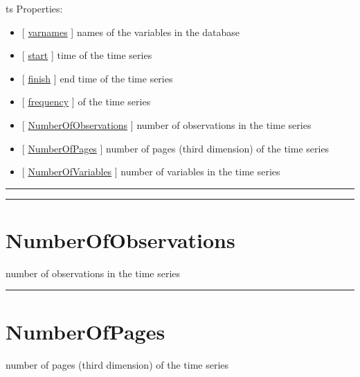 \documentclass[letterpaper,10pt,english]{sphinxmanual}
\begin{document}
ts  Properties:
\begin{itemize}
\item {} 
{[} {\hyperref[classes/time_series/@ts/ts:varnames]{varnames}} {]}   names of the variables in the database

\item {} 
{[} {\hyperref[classes/time_series/@ts/ts:start]{start}} {]} time of the time series

\item {} 
{[} {\hyperref[classes/time_series/@ts/ts:finish]{finish}} {]}   end time of the time series

\item {} 
{[} {\hyperref[classes/time_series/@ts/ts:frequency]{frequency}} {]} of the time series

\item {} 
{[} {\hyperref[classes/time_series/@ts/ts:numberofobservations]{NumberOfObservations}} {]}   number of observations in the time series

\item {} 
{[} {\hyperref[classes/time_series/@ts/ts:numberofpages]{NumberOfPages}} {]}   number of pages (third dimension) of the time series

\item {} 
{[} {\hyperref[classes/time_series/@ts/ts:numberofvariables]{NumberOfVariables}} {]}   number of variables in the time series

\end{itemize}


\bigskip\hrule{}\bigskip



\bigskip\hrule{}\bigskip



\section{NumberOfObservations}
\label{classes/time_series/@ts/ts:numberofobservations}\label{classes/time_series/@ts/ts:id1}
number of observations in the time series


\bigskip\hrule{}\bigskip



\section{NumberOfPages}
\label{classes/time_series/@ts/ts:numberofpages}\label{classes/time_series/@ts/ts:id2}
number of pages (third dimension) of the time series
\end{document}
